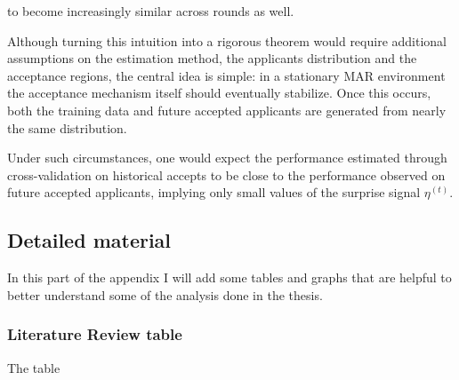 \documentclass[
  12pt,
]{article}
\begin{document}
to become increasingly similar across rounds as well.

Although turning this intuition into a rigorous theorem would require
additional assumptions on the estimation method, the applicants
distribution and the acceptance regions, the central idea is simple: in
a stationary MAR environment the acceptance mechanism itself should
eventually stabilize. Once this occurs, both the training data and
future accepted applicants are generated from nearly the same
distribution.

Under such circumstances, one would expect the performance estimated
through cross-validation on historical accepts to be close to the
performance observed on future accepted applicants, implying only small
values of the surprise signal \(\eta^{(t)}\).

\subsection{Detailed material}\label{detailed-material}

In this part of the appendix I will add some tables and graphs that are
helpful to better understand some of the analysis done in the thesis.

\newpage{}

\begin{landscape}

\subsubsection{Literature Review table}\label{literature-review-table}

The table \textcite{BuckerEtAl2013MNARRI}

\end{landscape}
\end{document}
